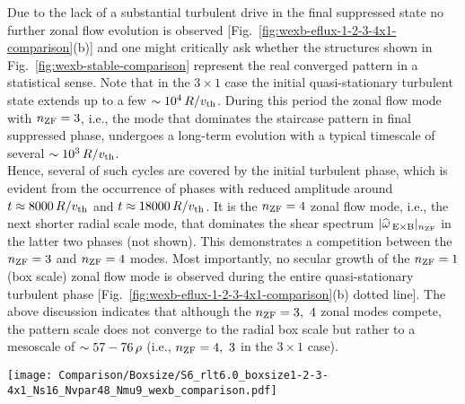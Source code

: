 Due to the lack of a substantial turbulent drive in the final suppressed state no further zonal flow evolution is observed [Fig.~\ref{fig:wexb-eflux-1-2-3-4x1-comparison}(b)] and one might critically ask whether the structures shown in Fig.~\ref{fig:wexb-stable-comparison} represent the real converged pattern in a statistical sense. 
Note that in the $3 \times 1$ case the initial quasi-stationary turbulent state extends up to a few $\sim 10^4\,R/v_{\mathrm{th}}$.
During this period the zonal flow mode with $n_\mathrm{ZF} = 3$, i.e., the mode that dominates the staircase pattern in final suppressed phase, undergoes a long-term evolution with a typical timescale of several $\sim 10^3\,R/v_{\mathrm{th}}$. \\
Hence, several of such cycles are covered by the initial turbulent phase, which is evident from the occurrence of phases with reduced amplitude around $t \approx 8000\,R/v_{\mathrm{th}}$ and $t \approx 18000\,    R/v_{\mathrm{th}}$.
It is the $n_\mathrm{ZF} = 4$ zonal flow mode, i.e., the next shorter radial scale mode, that dominates the shear spectrum $|\widehat{\omega}_{\mathrm{\:E \times B}}|_{n_\mathrm{ZF}}$ in the latter two phases (not shown). This demonstrates a competition between the $n_\mathrm{ZF} = 3$ and $n_\mathrm{ZF} = 4$ modes.
Most importantly, no secular growth of the $n_\mathrm{ZF} = 1$ (box scale) zonal flow mode is observed during the entire quasi-stationary turbulent phase [Fig.~\ref{fig:wexb-eflux-1-2-3-4x1-comparison}(b) dotted line].
The above discussion indicates that although the $n_\mathrm{ZF} = 3,~4$ zonal modes compete, the pattern scale does not converge to the radial box scale but rather to a mesoscale of $\sim 57 - 76\,\rho$ (i.e., $n_\mathrm{ZF} = 4,~3$ in the $3\times1$ case). 

\begin{center}
	\captionsetup{type=figure}
	\texttt{[image: Comparison/Boxsize/S6\_rlt6.0\_boxsize1-2-3-4x1\_Ns16\_Nvpar48\_Nmu9\_wexb\_comparison.pdf]}
	\label{fig:wexb-1-2-3-4x1-compariso}
\end{center}

